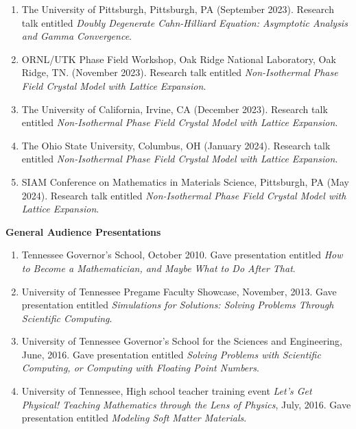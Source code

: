 \documentclass[11pt]{letter}
\begin{document}
\begin{enumerate}
	\item
The University of Pittsburgh, Pittsburgh, PA (September 2023).  Research talk entitled {\sl Doubly Degenerate Cahn-Hilliard Equation: Asymptotic Analysis and Gamma Convergence}.

	\item
ORNL/UTK Phase Field Workshop, Oak Ridge National Laboratory, Oak Ridge, TN. (November 2023).  Research talk entitled {\sl Non-Isothermal Phase Field Crystal Model with Lattice Expansion}.

	\item
The University of California, Irvine, CA (December 2023).  Research talk entitled {\sl Non-Isothermal Phase Field Crystal Model with Lattice Expansion}.

	\item
The Ohio State University, Columbus, OH (January 2024).  Research talk entitled {\sl Non-Isothermal Phase Field Crystal Model with Lattice Expansion}.

	\item
SIAM Conference on Mathematics in Materials Science, Pittsburgh, PA (May 2024). Research talk entitled {\sl Non-Isothermal Phase Field Crystal Model with Lattice Expansion}.

	\end{enumerate}

	\smallskip

{\LARGE\bf General Audience Presentations}

    \begin{enumerate}
    \item
Tennessee Governor's School, October 2010. Gave presentation entitled {\sl How to Become a Mathematician, and Maybe What to Do After That}.
    
    \item
University of Tennessee Pregame Faculty Showcase, November, 2013. Gave presentation entitled {\sl Simulations for Solutions: Solving Problems Through Scientific Computing}.
    
    \item
University of Tennessee Governor's School for the Sciences and Engineering, June, 2016. Gave presentation entitled {\sl Solving Problems with Scientific Computing, or Computing with Floating Point Numbers}.

	\item
University of Tennessee, High school teacher training event {\sl Let's Get Physical! Teaching Mathematics through the Lens of Physics}, July, 2016. Gave presentation entitled {\sl  Modeling Soft Matter Materials}.

	\end{enumerate}
	
\end{document}
